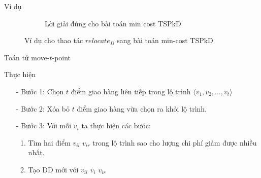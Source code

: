 \documentclass[compress]{beamer}
\begin{document}
\begin{frame}{Ví dụ}
\begin{figure}[H]
\begin{subfigure}{1\textwidth}
\label{exTSPkD3}
\caption{Lời giải đúng cho bài toán min cost TSPkD}
\end{subfigure}
\caption{Ví dụ cho thao tác $relocate_D$ sang bài toán min-cost TSPkD}\label{exTSPkD}
\end{figure}
\end{frame}
\begin{frame}{Toán tử move-$t$-point}
\begin{block}{Thực hiện}
\begin{itemize}
\item[-] Bước 1: Chọn $t$ điểm giao hàng liên tiếp trong lộ trình $\langle v_1,v_2,\ldots,v_t \rangle$
\item[-] Bước 2: Xóa bỏ $t$ điểm giao hàng vừa chọn ra khỏi lộ trình.
\item[-] Bước 3: Với mỗi $v_i$ ta thực hiện các bước: 
\begin{enumerate}
\item Tìm hai điểm $v_{il}$ $v_{ir}$ trong lộ trình sao cho lượng chi phí giảm được nhiều nhất.
\item Tạo DD mới với $v_{il}$ $v_{i}$ $v_{ir}$
\end{enumerate}
\end{itemize}
\end{block}
\end{frame}
\end{document}
